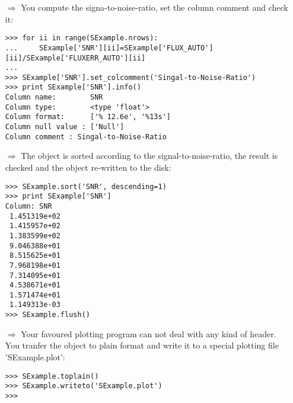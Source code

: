 \begin{itemize}
\item[$\Rightarrow$] You compute the signa-to-noise-ratio, set the column
comment and check it:
\begin{small}
\begin{verbatim}
>>> for ii in range(SExample.nrows):
...     SExample['SNR'][ii]=SExample['FLUX_AUTO'][ii]/SExample['FLUXERR_AUTO'][ii]
...
>>> SExample['SNR'].set_colcomment('Singal-to-Noise-Ratio')
>>> print SExample['SNR'].info()
Column name:        SNR
Column type:        <type 'float'>
Column format:      ['% 12.6e', '%13s']
Column null value : ['Null']
Column comment : Singal-to-Noise-Ratio
\end{verbatim}
\end{small}
\item[$\Rightarrow$] The object is sorted according to the
signal-to-noise-ratio, the result is checked and the \ad object
re-written to the disk:
\begin{small}
\begin{verbatim}
>>> SExample.sort('SNR', descending=1)
>>> print SExample['SNR']
Column: SNR
 1.451319e+02
 1.415957e+02
 1.383599e+02
 9.046388e+01
 8.515625e+01
 7.968198e+01
 7.314095e+01
 4.538671e+01
 1.571474e+01
 1.149313e-03
>>> SExample.flush()
\end{verbatim}
\end{small}

\item[$\Rightarrow$] Your favoured plotting program can not deal with any
kind of header. You tranfer the \ad object to plain format and write
it to a special plotting file 'SExample.plot':
\begin{small}
\begin{verbatim}
>>> SExample.toplain()
>>> SExample.writeto('SExample.plot')
>>>
\end{verbatim}
\end{small}


\end{itemize}
